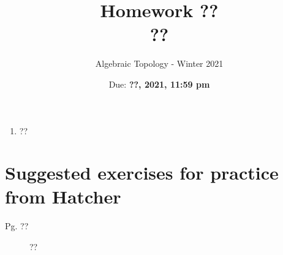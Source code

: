 \documentclass{article}
\title{Homework ?? \\ ??}
\author{Algebraic Topology - Winter 2021}
\date{Due: \textbf{??, 2021, 11:59 pm}}
\begin{document}
\maketitle

\begin{enumerate}
    \item ??
\end{enumerate}


\section*{Suggested exercises for practice from Hatcher}

\begin{description}
    \item[Pg. ??] ??
\end{description}
\end{document}
